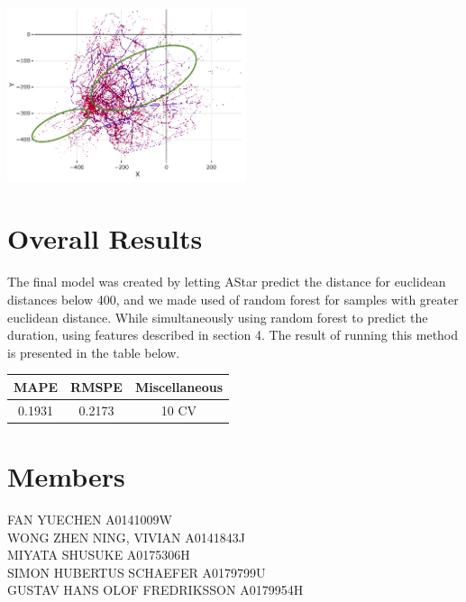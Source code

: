 \documentclass{article}
\newenvironment{Figure}
{\par\medskip\noindent\minipage{\linewidth}}
{\endminipage\par\medskip}
\begin{document}
\begin{multicols}{2}
\begin{Figure}
    \centering
    \includegraphics[width=7cm]{elliptic_approach.png}
    \label{fig:el_plot}
\end{Figure}


\section{Overall Results}
The final model was created by letting AStar predict the distance for euclidean distances below 400, and we made used of random forest for samples with greater euclidean distance. While simultaneously using random forest to predict the duration, using features described in section 4. The result of running this method is presented in the table below.
\begin{center}
\begin{tabular}{c|c|c}
     MAPE & RMSPE & Miscellaneous  \\
     \hline 0.1931 & 0.2173 & 10 CV
\end{tabular}
\end{center}
 

\section{Members}
FAN YUECHEN	A0141009W \\ WONG ZHEN NING, VIVIAN	A0141843J \\ MIYATA SHUSUKE	A0175306H\\ SIMON HUBERTUS SCHAEFER	A0179799U\\ GUSTAV HANS OLOF FREDRIKSSON	A0179954H
\end{multicols}
\end{document}
